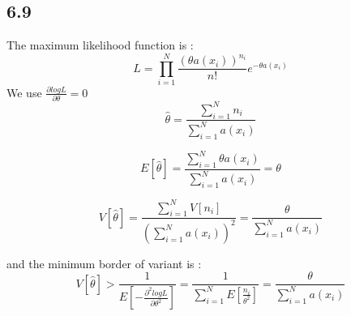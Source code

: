 \documentclass{article}
\begin{document}
\begin{CJK*}{GBK}{song}
 
 
 \section{6.9}
 
 The maximum likelihood function is :
 \begin{equation}
 L=\prod_{i=1}^N\frac{(\theta a(x_i))^{n_i}}{n!}e^{-\theta a(x_i)}
 \end{equation}
 We use $\frac{\partial logL}{\partial \theta}=0$
 \begin{equation}
 \hat{\theta}=\frac{\sum_{i=1}^Nn_i}{\sum_{i=1}^Na(x_i)}
 \end{equation}
 
  \begin{equation}
 E[\hat{\theta}]=\frac{\sum_{i=1}^N\theta a(x_i)}{\sum_{i=1}^Na(x_i)}=\theta
 \end{equation}

  \begin{equation}
 V[\hat{\theta}]=\frac{\sum_{i=1}^NV[n_i]}{(\sum_{i=1}^Na(x_i))^2}=\frac{\theta}{\sum_{i=1}^Na(x_i)}
 \end{equation}
 
 and the minimum border of variant is :
 \begin{equation}
 V[\hat{\theta}]>\frac{1}{E[-\frac{\partial^2logL}{\partial\theta^2}]}=\frac{1}{\sum_{i=1}^NE[\frac{n_i}{\theta^2}]}=\frac{\theta}{\sum_{i=1}^Na(x_i)}
 \end{equation}
 
 
 
 
 
 
 
\end{CJK*}
\end{document}
